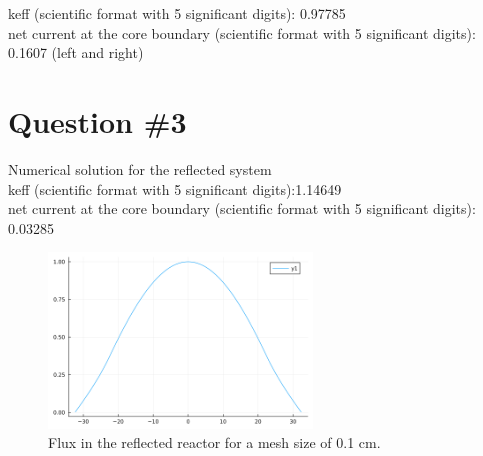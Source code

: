 \documentclass[11pt,a4paper]{article}
\begin{document}
keff (scientific format with 5 significant digits):  0.97785\\
net current at the core boundary (scientific format with 5 significant digits): 0.1607 (left and right)\\

\section{Question \#3}
Numerical solution for the reflected system \\
keff (scientific format with 5 significant digits):1.14649\\
net current at the core boundary (scientific format with 5 significant digits): 0.03285\\
\begin{figure}[h]
	\includegraphics[width=7cm]{../figs/ex2/reflector.png}
	\centering
	\caption{Flux in the reflected reactor for a mesh size of 0.1 cm.}
\end{figure}

\end{document}
